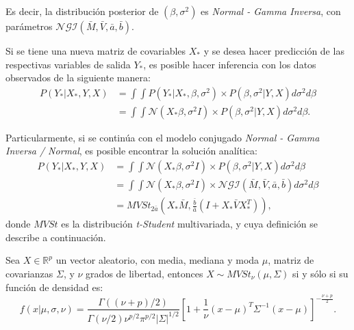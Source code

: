 Es decir, la distribuci\'on posterior de $(\beta,\sigma^2)$ es \textit{Normal - Gamma Inversa}, con par\'ametros $\mathcal{NGI}(\bar{M},\bar{V},\bar{a},\bar{b})$.

Si se tiene una nueva matriz de covariables $X_*$ y se desea hacer predicci\'on de las respectivas variables de salida $Y_*$, es posible hacer inferencia con los datos observados de la siguiente manera:
\begin{equation*}
\begin{aligned}
    P(Y_*|X_*,Y,X)
    &= \int \int P(Y_*|X_*,\beta,\sigma^2) \times P(\beta,\sigma^2|Y,X) d\sigma^2 d\beta \\
    &= \int \int \mathcal{N}(X_*\beta,\sigma^2I) \times P(\beta,\sigma^2|Y,X) d\sigma^2 d\beta.
\end{aligned}
\end{equation*}

Particularmente, si se contin\'ua con el modelo conjugado \textit{Normal - Gamma Inversa / Normal}, es posible encontrar la soluci\'on anal\'itica:
\begin{equation*}
\begin{aligned}
    P(Y_*|X_*,Y,X)
    &= \int \int \mathcal{N}(X_*\beta,\sigma^2I) \times P(\beta,\sigma^2|Y,X) d\sigma^2 d\beta \\
    &= \int \int \mathcal{N}(X_*\beta,\sigma^2I) \times \mathcal{NGI}(\bar{M},\bar{V},\bar{a},\bar{b}) d\sigma^2 d\beta \\
    &= MVSt_{2\bar{a}} 
       \left(
        X_*\bar{M},\frac{\bar{b}}{\bar{a}}\left(I + X_*\bar{V}X_*^T\right)
       \right),
\end{aligned}
\end{equation*}
donde $MVSt$ es la distribuci\'on \textit{t-Student} multivariada, y cuya definici\'on se describe a continuaci\'on. 

\begin{defin}
    Sea $X \in \mathbb{R}^p$ un vector aleatorio, con media, mediana y moda $\mu$, matriz de covarianzas $\Sigma $, y $\nu$ grados de libertad, entonces $X \sim MVSt_{\nu}(\mu,\Sigma)$ si y s\'olo si su funci\'on de densidad es:
\begin{equation*}
    f(x|\mu,\sigma,\nu) = 
    \frac{\Gamma((\nu+p)/2)}{\Gamma(\nu/2)\nu^{p/2}\pi^{p/2}|\Sigma|^{1/2}}
    \left[1 + \frac{1}{\nu} (x-\mu)^T\Sigma^{-1}(x-\mu)\right]^{-\frac{\nu+p}{2}}.
\end{equation*}
\end{defin}

\newpage